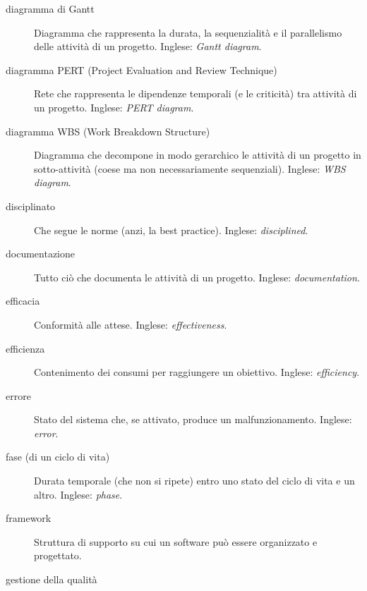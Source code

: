 \documentclass[a4paper]{article}
\begin{document}
\begin{description}
	\item[diagramma di Gantt] 

			Diagramma che rappresenta la durata, la sequenzialità e il parallelismo delle attività di un progetto. Inglese: \emph{Gantt diagram}.
			
	\item[diagramma PERT (Project Evaluation and Review Technique)] 

			Rete che rappresenta le dipendenze temporali (e le criticità) tra attività di un progetto. Inglese: \emph{PERT diagram}.
			
	\item[diagramma WBS (Work Breakdown Structure)] 

			Diagramma che decompone in modo gerarchico le attività di un progetto in sotto-attività (coese ma non necessariamente sequenziali). Inglese: \emph{WBS diagram}.
			
	\item[disciplinato] 

			Che segue le norme (anzi, la best practice). Inglese: \emph{disciplined}.
			
	\item[documentazione] 

			Tutto ciò che documenta le attività di un progetto. Inglese: \emph{documentation}.
			
	\item[efficacia] 

			Conformità alle attese. Inglese: \emph{effectiveness}.
			
	\item[efficienza] 

			Contenimento dei consumi per raggiungere un obiettivo. Inglese: \emph{efficiency}.
			
	\item[errore] 

			Stato del sistema che, se attivato, produce un malfunzionamento. Inglese: \emph{error}.
			
	\item[fase (di un ciclo di vita)] 

			Durata temporale (che non si ripete) entro uno stato del ciclo di vita e un altro. Inglese: \emph{phase}.
			
	\item[framework] 

			Struttura di supporto su cui un software può essere organizzato e progettato.
			
	\item[gestione della qualità] 


\end{description}
\end{document}
